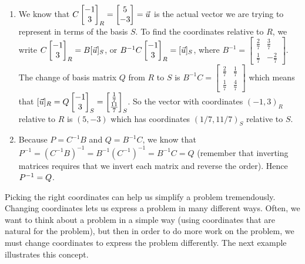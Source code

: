\begin{example}
\begin{enumerate}
\item
We know that $C \begin{bmatrix} -1\\3 \end{bmatrix}_{R} = \begin{bmatrix} 5\\-3 \end{bmatrix} =\vec u$ is the actual vector we are trying to represent in terms of the basis $S$. To find the coordinates relative to $R$, we write $C \begin{bmatrix} -1\\3 \end{bmatrix}_{R} = B[\vec u]_{S}$, or $B^{-1}C  \begin{bmatrix} -1\\3 \end{bmatrix}_{R}= [\vec u]_{S}$, where 
$B^{-1} = 
\begin{bmatrix}
 \frac{2}{7} & \frac{3}{7} \\
 \frac{1}{7} & -\frac{2}{7}
\end{bmatrix}
$. 
The change of basis matrix $Q$ from $R$ to $S$  is 
$B^{-1}C =  
\begin{bmatrix}
 \frac{2}{7} & \frac{1}{7} \\
 \frac{1}{7} & \frac{4}{7}
\end{bmatrix}
$ which means that $[\vec u]_{R}= Q\begin{bmatrix} -1\\3 \end{bmatrix}_S = \begin{bmatrix} \frac{1}{7}\\\frac{11}{7} \end{bmatrix}_{S}$.
So the vector with coordinates $(-1,3)_{R}$ relative to $R$ is $(5,-3)$ which has coordinates $(1/7,11/7)_{S}$ relative to $S$. 
\item Because $P=C^{-1}B$ and $Q=B^{-1}C$, we know that $P^{-1} = (C^{-1}B)^{-1} = B^{-1}(C^{-1})^{-1} = B^{-1}C=Q$ (remember that inverting matrices requires that we invert each matrix and reverse the order). Hence $P^{-1} = Q$.

\end{enumerate}
\end{example}

Picking the right coordinates can help us simplify a problem tremendously.  Changing coordinates lets us express a problem in many different ways.  Often, we want to think about a problem in a simple way (using coordinates that are natural for the problem), but then in order to do more work on the problem, we must change coordinates to express the problem differently.  The next example illustrates this concept.

